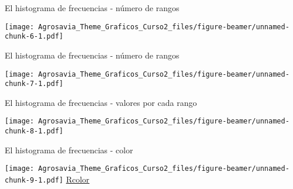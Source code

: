 \documentclass[ignorenonframetext,]{beamer}
\newenvironment{Shaded}{\begin{snugshade}}{\end{snugshade}}
\newcommand{\KeywordTok}[1]{\textcolor[rgb]{0.13,0.29,0.53}{\textbf{#1}}}
\newcommand{\DataTypeTok}[1]{\textcolor[rgb]{0.13,0.29,0.53}{#1}}
\newcommand{\DecValTok}[1]{\textcolor[rgb]{0.00,0.00,0.81}{#1}}
\newcommand{\StringTok}[1]{\textcolor[rgb]{0.31,0.60,0.02}{#1}}
\newcommand{\OtherTok}[1]{\textcolor[rgb]{0.56,0.35,0.01}{#1}}
\newcommand{\OperatorTok}[1]{\textcolor[rgb]{0.81,0.36,0.00}{\textbf{#1}}}
\newcommand{\NormalTok}[1]{#1}
\begin{document}
\begin{frame}[fragile]{El histograma de frecuencias - número de rangos}

\begin{Shaded}
\end{Shaded}

\texttt{[image: Agrosavia\_Theme\_Graficos\_Curso2\_files/figure-beamer/unnamed-chunk-6-1.pdf]}

\end{frame}

\begin{frame}[fragile]{El histograma de frecuencias - número de rangos}

\begin{Shaded}
\end{Shaded}

\texttt{[image: Agrosavia\_Theme\_Graficos\_Curso2\_files/figure-beamer/unnamed-chunk-7-1.pdf]}

\end{frame}

\begin{frame}[fragile]{El histograma de frecuencias - valores por cada
rango}

\begin{Shaded}
\end{Shaded}

\texttt{[image: Agrosavia\_Theme\_Graficos\_Curso2\_files/figure-beamer/unnamed-chunk-8-1.pdf]}

\end{frame}

\begin{frame}[fragile]{El histograma de frecuencias - color}

\begin{Shaded}
\end{Shaded}

\texttt{[image: Agrosavia\_Theme\_Graficos\_Curso2\_files/figure-beamer/unnamed-chunk-9-1.pdf]}
\underline{\tiny{\textcolor{blue}{\href{http://www.stat.columbia.edu/~tzheng/files/Rcolor.pdf}{Rcolor}}}}

\end{frame}
\end{document}
